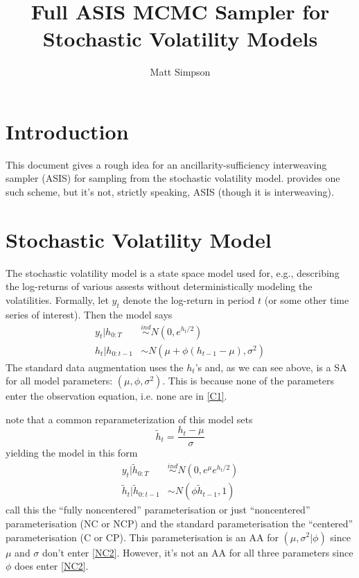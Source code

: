 \documentclass{article}
\author{Matt Simpson}
\title{Full ASIS MCMC Sampler for Stochastic Volatility Models}
\begin{document}
\maketitle

\section{Introduction}
This document gives a rough idea for an ancillarity-sufficiency interweaving sampler (ASIS) for sampling from the stochastic volatility model. \citet{kastner2013ancillarity} provides one such scheme, but it's not, strictly speaking, ASIS (though it is interweaving).

\section{Stochastic Volatility Model}

The stochastic volatility model is a state space model used for, e.g., describing the log-returns of various assests without deterministically modeling the volatilities. Formally, let $y_t$ denote the log-return in period $t$ (or some other time series of interest). Then the model says
\begin{align}
y_t|h_{0:T} & \stackrel{ind}{\sim}N(0, e^{h_t/2}) \label{C1}\\
h_t |h_{0:t-1} &\sim N( \mu + \phi(h_{t-1}-\mu), \sigma^2) \label{C2}
\end{align}
The standard data augmentation uses the $h_t$'s and, as we can see above, is a SA for all model parameters: $(\mu, \phi, \sigma^2)$. This is because none of the parameters enter the observation equation, i.e. none are in \ref{C1}. 

\citeauthor{kastner2013ancillarity} note that a common reparameterization of this model sets
\[
\tilde{h}_t = \frac{h_t - \mu}{\sigma}
\]
yielding the model in this form
\begin{align}
y_t|\tilde{h}_{0:T} & \stackrel{ind}{\sim}N(0, e^\mu e^{h_t/2}) \label{NC1}\\
\tilde{h}_t|\tilde{h}_{0:t-1} & \sim N(\phi\tilde{h}_{t-1}, 1) \label{NC2}
\end{align}
\citeauthor{kastner2013ancillarity} call this the ``fully noncentered'' parameterisation or just ``noncentered'' parameterisation (NC or NCP) and the standard parameterisation the ``centered'' parameterisation (C or CP). This parameterisation is an AA for $(\mu,\sigma^2|\phi)$ since $\mu$ and $\sigma$ don't enter \ref{NC2}. However, it's not an AA for all three parameters since $\phi$ does enter \ref{NC2}.
\end{document}
